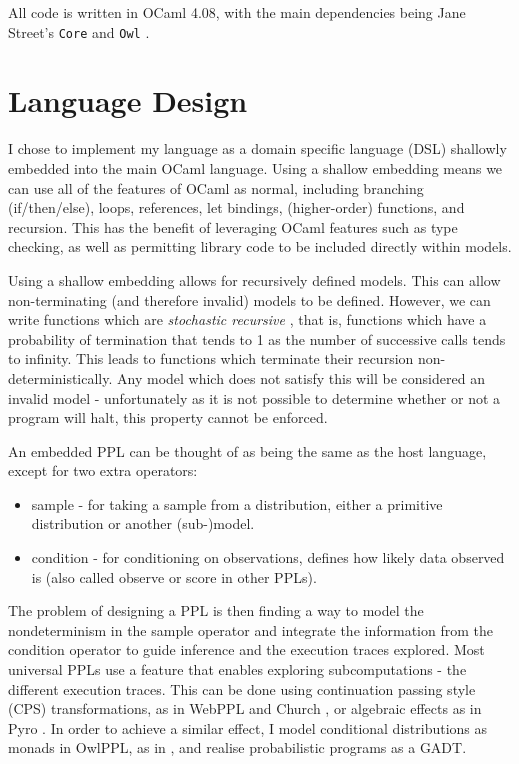 All code is written in OCaml 4.08, with the main dependencies being Jane Street's \texttt{Core} and \texttt{Owl} \cite{owl}.	
	
\section{Language Design}
I chose to implement my language as a domain specific language (DSL) shallowly embedded into the main OCaml language. Using a shallow embedding means we can use all of the features of OCaml as normal, including branching (if/then/else), loops, references, let bindings, (higher-order) functions, and recursion. This has the benefit of leveraging OCaml features such as type checking, as well as permitting library code to be included directly within models.

Using a shallow embedding allows for recursively defined models. This can allow non-terminating (and therefore invalid) models to be defined. However, we can write functions which are \textit{stochastic recursive} \cite{siegmund}, that is, functions which have a probability of termination that tends to 1 as the number of successive calls tends to infinity. This leads to functions which terminate their recursion non-deterministically. Any model which does not satisfy this will be considered an invalid model - unfortunately as it is not possible to determine whether or not a program will halt, this property cannot be enforced. 
	
An embedded PPL can be thought of as being the same as the host language, except for two extra operators:
\begin{itemize}
	\item sample - for taking a sample from a distribution, either a primitive distribution or another (sub-)model.
	\item condition - for conditioning on observations, defines how likely data observed is (also called observe or score in other PPLs).
\end{itemize}
The problem of designing a PPL is then finding a way to model the nondeterminism in the sample operator and integrate the information from the condition operator to guide inference and the execution traces explored. Most universal PPLs use a feature that enables exploring subcomputations - the different execution traces. This can be done using continuation passing style (CPS) transformations, as in WebPPL and Church \cite{mobus2018structure,goodman2012church}, or algebraic effects as in Pyro \cite{bingham2019pyro}. In order to achieve a similar effect, I model conditional distributions as monads in OwlPPL, as in \cite{scibior2015practical}, and realise probabilistic programs as a GADT.

